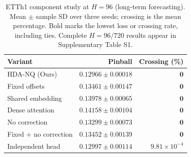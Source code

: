 \begin{table}[t]
\centering\small
\caption{ETTh1 component study at $H=96$ (long-term forecasting). Mean $\pm$ sample SD over three seeds; crossing is the mean percentage. Bold marks the lowest loss or crossing rate, including ties. Complete $H=96/720$ results appear in Supplementary Table S1.}
\label{tab:final-ablation}
\begin{tabular*}{\linewidth}{@{\extracolsep{\fill}}lrr@{}}
\toprule
Variant & Pinball & Crossing (\%) \\
\midrule
HDA-NQ (Ours) & $\boldsymbol{0.12966\pm0.00018}$ & $\boldsymbol{0}$ \\
Fixed offsets & $0.13461\pm0.00147$ & $\boldsymbol{0}$ \\
Shared embedding & $0.13978\pm0.00065$ & $\boldsymbol{0}$ \\
Dense attention & $0.14158\pm0.00104$ & $\boldsymbol{0}$ \\
No correction & $0.13299\pm0.00073$ & $\boldsymbol{0}$ \\
Fixed + no correction & $0.13452\pm0.00139$ & $\boldsymbol{0}$ \\
Independent head & $0.12997\pm0.00114$ & $9.81\times10^{-4}$ \\
\bottomrule
\end{tabular*}
\end{table}
